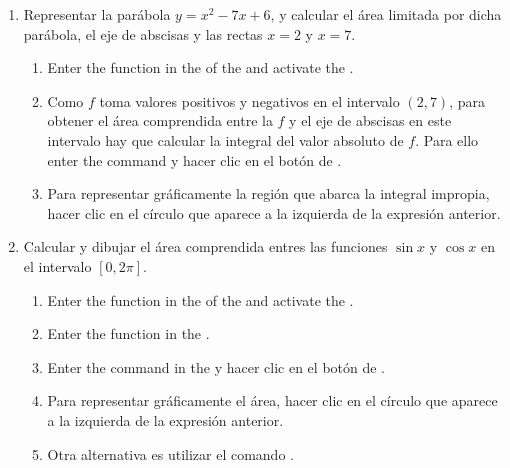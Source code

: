 \begin{enumerate}[leftmargin=*]
\item Representar la parábola $y=x^{2}-7x+6$, y calcular el área limitada por dicha parábola, el eje de abscisas y las rectas $x=2$ y $x=7$.
      \begin{indication}
      \begin{enumerate}
      \item Enter the function  in the  of the  and activate the .
      \item Como $f$ toma valores positivos y negativos en el intervalo $(2,7)$, para obtener el área comprendida entre la $f$ y el eje de abscisas en este intervalo hay que calcular la integral del valor absoluto de $f$.
            Para ello enter the command  y hacer clic en el botón de .
      \item Para representar gráficamente la región que abarca la integral impropia, hacer clic en el círculo que aparece a la izquierda de la expresión anterior.
      \end{enumerate}
      \end{indication}


\item Calcular y dibujar el área comprendida entres las funciones $\sin x$ y $\cos x$ en el intervalo $[0,2\pi]$.
      \begin{indication}
      \begin{enumerate}
      \item Enter the function  in the  of the  and activate the .
      \item Enter the function  in the .
      \item Enter the command  in the  y hacer clic en el botón de .
      \item Para representar gráficamente el área, hacer clic en el círculo que aparece a la izquierda de la expresión anterior.
      \item Otra alternativa es utilizar el comando .
      \end{enumerate}
      \end{indication}



\end{enumerate}
